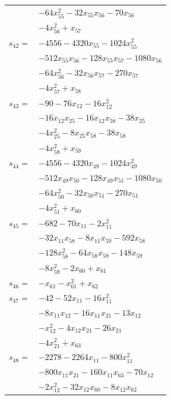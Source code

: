 \begin{longtable}{@{}r@{\;}l@{}}
 & \(\displaystyle -64x_{55}^{2} -32x_{55}x_{56} -70x_{56}\) \\
 & \(\displaystyle -4x_{56}^{2} +x_{57}\) \\[3pt]
\(s_{42}=\) & \(\displaystyle -4556 -4320x_{55} -1024x_{55}^{2}\) \\
 & \(\displaystyle -512x_{55}x_{56} -128x_{55}x_{57} -1080x_{56}\) \\
 & \(\displaystyle -64x_{56}^{2} -32x_{56}x_{57} -270x_{57}\) \\
 & \(\displaystyle -4x_{57}^{2} +x_{58}\) \\[3pt]
\(s_{43}=\) & \(\displaystyle -90 -76x_{12} -16x_{12}^{2}\) \\
 & \(\displaystyle -16x_{12}x_{25} -16x_{12}x_{58} -38x_{25}\) \\
 & \(\displaystyle -4x_{25}^{2} -8x_{25}x_{58} -38x_{58}\) \\
 & \(\displaystyle -4x_{58}^{2} +x_{59}\) \\[3pt]
\(s_{44}=\) & \(\displaystyle -4556 -4320x_{49} -1024x_{49}^{2}\) \\
 & \(\displaystyle -512x_{49}x_{50} -128x_{49}x_{51} -1080x_{50}\) \\
 & \(\displaystyle -64x_{50}^{2} -32x_{50}x_{51} -270x_{51}\) \\
 & \(\displaystyle -4x_{51}^{2} +x_{60}\) \\[3pt]
\(s_{45}=\) & \(\displaystyle -682 -70x_{11} -2x_{11}^{2}\) \\
 & \(\displaystyle -32x_{11}x_{58} -8x_{11}x_{59} -592x_{58}\) \\
 & \(\displaystyle -128x_{58}^{2} -64x_{58}x_{59} -148x_{59}\) \\
 & \(\displaystyle -8x_{59}^{2} -2x_{60} +x_{61}\) \\[3pt]
\(s_{46}=\) & \(\displaystyle -x_{61} -x_{61}^{2} +x_{62}\) \\[3pt]
\(s_{47}=\) & \(\displaystyle -42 -52x_{11} -16x_{11}^{2}\) \\
 & \(\displaystyle -8x_{11}x_{12} -16x_{11}x_{21} -13x_{12}\) \\
 & \(\displaystyle -x_{12}^{2} -4x_{12}x_{21} -26x_{21}\) \\
 & \(\displaystyle -4x_{21}^{2} +x_{63}\) \\[3pt]
\(s_{48}=\) & \(\displaystyle -2278 -2264x_{11} -800x_{11}^{2}\) \\
 & \(\displaystyle -800x_{11}x_{21} -160x_{11}x_{63} -70x_{12}\) \\
 & \(\displaystyle -2x_{12}^{2} -32x_{12}x_{60} -8x_{12}x_{62}\) \\

\end{longtable}
